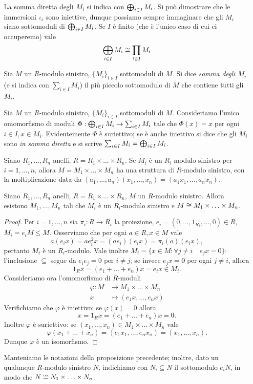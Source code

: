 La somma diretta degli $M_i$ si indica con $\bigoplus_{i\in I}M_i$. Si può dimostrare che le immersioni $\iota_i$ sono iniettive, dunque possiamo sempre immaginare che gli $M_i$ siano sottomoduli di $\bigoplus_{i\in I}M_i$. Se $I$ è finito (che è l'unico caso di cui ci occuperemo) vale
$$
\bigoplus_{i\in I}M_i\cong \prod_{i\in I}M_i
$$


\begin{definition}
Sia $M$ un $R$-modulo sinistro, $\{M_i\}_{i\in I}$ sottomoduli di $M$. Si dice \emph{somma degli $M_i$} (e si indica con $\sum_{i\in I}M_i$) il più piccolo sottomodulo di $M$ che contiene tutti gli $M_i$.
\end{definition}

\begin{definition}
Sia $M$ un $R$-modulo sinistro, $\{M_i\}_{i\in I}$ sottomoduli di $M$. Consideriamo l'unico omomorfismo di moduli $\Phi:\bigoplus_{i\in I}M_i\to\sum_{i\in I}M_i$ tale che $\Phi(x)=x$ per ogni $i\in I\comma x\in M_i$. Evidentemente $\Phi$ è suriettivo; se è anche iniettivo si dice che gli $M_i$ sono \emph{in somma diretta} e si scrive $\sum_{i\in I}M_i=\bigoplus_{i\in I}M_i$.
\end{definition}


Siano $R_1,\ldots,R_n$ anelli, $R=R_1\times\ldots\times R_n$. Se $M_i$ è un $R_i$-modulo sinistro per $i=1,\ldots,n$, allora $M=M_1\times\ldots\times M_n$ ha una struttura di $R$-modulo sinistro, con la moltiplicazione data da $(a_1,\ldots,a_n)(x_1,\ldots,x_n)=(a_1x_1,\ldots,a_nx_n)$.

\begin{proposition}
Siano $R_1,\ldots,R_n$ anelli, $R=R_1\times\ldots\times R_n$, $M$ un $R$-modulo sinistro. Allora esistono $M_1,\ldots,M_n$ tali che $M_i$ è un $R_i$-modulo sinistro e $M\cong M_1\times\ldots\times M_n$.
\end{proposition}
\begin{proof}
Per $i=1,\ldots, n$ sia $\pi_i:R\to R_i$ la proiezione, $e_i=(0,\ldots,1_{R_i},\ldots,0)\in R$, $M_i=e_iM\le M$. Osserviamo che per ogni $a\in R\comma x\in M$ vale
$$
a(e_ix)=ae_i^2x=(ae_i)(e_ix)=\pi_i(a)(e_ix),
$$
pertanto $M_i$ è un $R_i$-modulo. Vale inoltre $M_i=\{x\in M:\forall j\neq i\quad e_jx=0\}$: l'inclusione $\subseteq$ segue da $e_ie_j=0$ per $i\neq j$; se invece $e_jx=0$ per ogni $j\neq i$, allora
$$
1_Rx=(e_1+\ldots+e_n)x=e_ix\in M_i.
$$
Consideriamo ora l'omomorfismo di $R$-moduli
\begin{align*}
\varphi:M&\longrightarrow M_1\times\ldots\times M_n\\
x&\longmapsto (e_1x,\ldots,e_nx)
\end{align*}
Verifichiamo che $\varphi$ è iniettivo: se $\varphi(x)=0$ allora
$$
x=1_Rx=(e_1+\ldots+e_n)x=0.
$$
Inoltre $\varphi$ è suriettivo: se $(x_1,\ldots,x_n)\in M_1\times\ldots\times M_n$ vale
$$
\varphi(x_1+\ldots+x_n)=(e_1x_1,\ldots,e_nx_n)=(x_1,\ldots,x_n).
$$
Dunque $\varphi$ è un isomorfismo.
\end{proof}
Manteniamo le notazioni della proposizione precedente; inoltre, dato un qualunque $R$-modulo sinistro $N$, indichiamo con $N_i\subseteq N$ il sottomodulo $e_iN$, in modo che $N\cong N_1\times\ldots\times N_n$.


